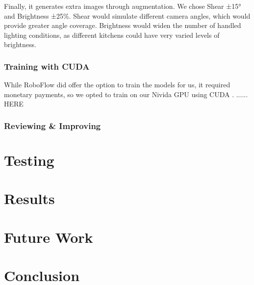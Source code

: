 \documentclass{article}
\begin{document}
Finally, it generates extra images through augmentation. We chose Shear ±15° and Brightness ±25\%. Shear would simulate different camera angles, which would provide greater angle coverage. Brightness would widen the number of handled lighting conditions, as different kitchens could have very varied levels of brightness.

    \subsubsection{Training with CUDA}
    While RoboFlow did offer the option to train the models for us, it required monetary payments, so we opted to train on our Nivida GPU using CUDA \cite{cudacuda}.
    ...... HERE

    \subsubsection{Reviewing \& Improving}


    \section{Testing}

    \section{Results}

    \section{Future Work}

    \section{Conclusion}

    \pagebreak

    
  

  
  
  
\end{document}
